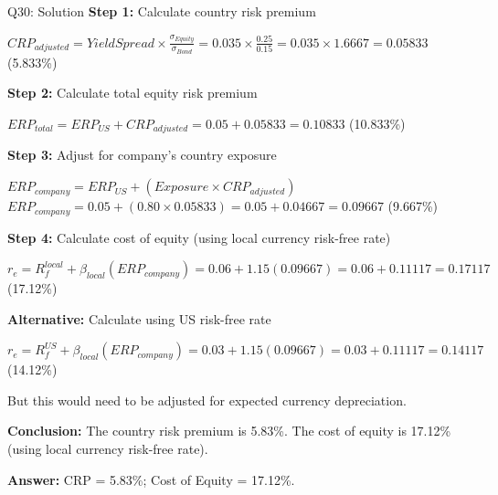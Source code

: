 \documentclass{beamer}
\renewcommand{\scriptsize}{\fontsize{6pt}{7pt}\selectfont}
\begin{document}
	\begin{frame}{Q30: Solution}
		\scriptsize
		\textbf{Step 1:} Calculate country risk premium
		
		$CRP_{adjusted} = Yield Spread \times \frac{\sigma_{Equity}}{\sigma_{Bond}} = 0.035 \times \frac{0.25}{0.15} = 0.035 \times 1.6667 = 0.05833$ (5.833\%)
		
		\vspace{2pt}
		\textbf{Step 2:} Calculate total equity risk premium
		
		$ERP_{total} = ERP_{US} + CRP_{adjusted} = 0.05 + 0.05833 = 0.10833$ (10.833\%)
		
		\vspace{2pt}
		\textbf{Step 3:} Adjust for company's country exposure
		
		$ERP_{company} = ERP_{US} + (Exposure \times CRP_{adjusted})$
		$ERP_{company} = 0.05 + (0.80 \times 0.05833) = 0.05 + 0.04667 = 0.09667$ (9.667\%)
		
		\vspace{2pt}
		\textbf{Step 4:} Calculate cost of equity (using local currency risk-free rate)
		
		$r_e = R_f^{local} + \beta_{local}(ERP_{company}) = 0.06 + 1.15(0.09667) = 0.06 + 0.11117 = 0.17117$ (17.12\%)
		
		\vspace{2pt}
		\textbf{Alternative:} Calculate using US risk-free rate
		
		$r_e = R_f^{US} + \beta_{local}(ERP_{company}) = 0.03 + 1.15(0.09667) = 0.03 + 0.11117 = 0.14117$ (14.12\%)
		
		But this would need to be adjusted for expected currency depreciation.
		
		\vspace{2pt}
		\textbf{Conclusion:} The country risk premium is 5.83\%. The cost of equity is 17.12\% (using local currency risk-free rate).
		
		\textbf{Answer:} CRP = 5.83\%; Cost of Equity = 17.12\%.
	\end{frame}
	
\end{document}
